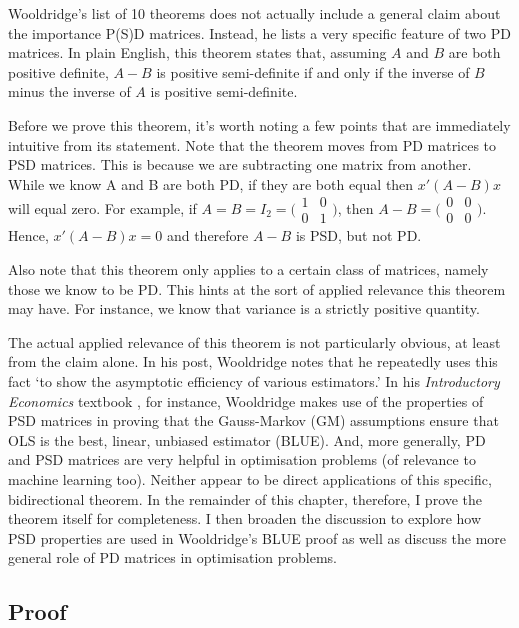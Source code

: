 \documentclass[
]{book}
\begin{document}
Wooldridge's list of 10 theorems does not actually include a general claim about the importance P(S)D matrices. Instead, he lists a very specific feature of two PD matrices. In plain English, this theorem states that, assuming \(A\) and \(B\) are both positive definite, \(A-B\) is positive semi-definite if and only if the inverse of \(B\) minus the inverse of \(A\) is positive semi-definite.

Before we prove this theorem, it's worth noting a few points that are immediately intuitive from its statement. Note that the theorem moves from PD matrices to PSD matrices. This is because we are subtracting one matrix from another. While we know A and B are both PD, if they are both equal then \(x'(A-B)x\) will equal zero. For example, if \(A = B = I_2 = \big(\begin{smallmatrix} 1 & 0\\ 0 & 1 \end{smallmatrix}\big)\), then \(A-B = \big(\begin{smallmatrix} 0 & 0\\ 0 & 0 \end{smallmatrix}\big)\). Hence, \(x'(A-B)x = 0\) and therefore \(A-B\) is PSD, but not PD.

Also note that this theorem only applies to a certain class of matrices, namely those we know to be PD. This hints at the sort of applied relevance this theorem may have. For instance, we know that variance is a strictly positive quantity.

The actual applied relevance of this theorem is not particularly obvious, at least from the claim alone. In his post, Wooldridge notes that he repeatedly uses this fact `to show the asymptotic efficiency of various estimators.' In his \emph{Introductory Economics} textbook \citeyearpar{Wooldridge_intro}, for instance, Wooldridge makes use of the properties of PSD matrices in proving that the Gauss-Markov (GM) assumptions ensure that OLS is the best, linear, unbiased estimator (BLUE). And, more generally, PD and PSD matrices are very helpful in optimisation problems (of relevance to machine learning too). Neither appear to be direct applications of this specific, bidirectional theorem. In the remainder of this chapter, therefore, I prove the theorem itself for completeness. I then broaden the discussion to explore how PSD properties are used in Wooldridge's BLUE proof as well as discuss the more general role of PD matrices in optimisation problems.

\hypertarget{pd_proof}{%
\subsection{Proof}\label{pd_proof}}
\end{document}
